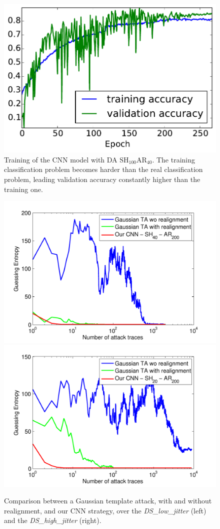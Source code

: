 \begin{figure}[h]
\centering
\includegraphics[width=.5\textwidth]{../Figures/CHES2017/acc_DAadd_remove100_shift_40_deep_good_for_CW_shift_wo_DO.pdf} 
\caption[Excessive Data Augmentation example.]{Training of the CNN model with DA $\mathrm{SH}_{100}\mathrm{AR}_{40}$. The training classification problem becomes harder than the real classification problem, leading validation accuracy constantly higher than the training one.}\label{fig:high_acc}
\end{figure}

\begin{figure}
\includegraphics[width=.5\textwidth]{../Figures/CHES2017/results_low_jitter_new.pdf} 
\includegraphics[width=.5\textwidth]{../Figures/CHES2017/results_high_jitter_new.pdf} 
\caption[Comparison between a Gaussian template attack, with and without realignment, and our CNN strategy, over the  \emph{DS\_low\_jitter} and the  \emph{DS\_high\_jitter}.]{Comparison between a Gaussian template attack, with and without realignment, and our CNN strategy, over the  \emph{DS\_low\_jitter} (left) and the  \emph{DS\_high\_jitter} (right).}\label{fig:compareTA}
\end{figure}



